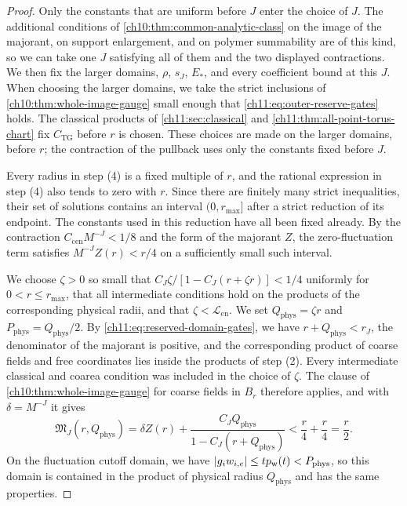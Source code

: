\begin{proof}
Only the constants that are uniform before $J$ enter the choice of $J$. The additional conditions of \cref{ch10:thm:common-analytic-class} on the image of the majorant, on support enlargement, and on polymer summability are of this kind, so we can take one $J$ satisfying all of them and the two displayed contractions. We then fix the larger domains, $\rho$, $s_J$, $E_*$, and every coefficient bound at this $J$. When choosing the larger domains, we take the strict inclusions of \cref{ch10:thm:whole-image-gauge} small enough that \eqref{ch11:eq:outer-reserve-gates} holds. The classical products of \cref{ch11:sec:classical} and \cref{ch11:thm:all-point-torus-chart} fix $C_{\mathrm{TG}}$ before $r$ is chosen. These choices are made on the larger domains, before $r$; the contraction of the pullback uses only the constants fixed before $J$.

Every radius in step (4) is a fixed multiple of $r$, and the rational expression in step (4) also tends to zero with $r$. Since there are finitely many strict inequalities, their set of solutions contains an interval $(0,r_{\max}]$ after a strict reduction of its endpoint. The constants used in this reduction have all been fixed already. By the contraction $C_{\mathrm{cen}}M^{-J}<1/8$ and the form of the majorant $Z$, the zero-fluctuation term satisfies $M^{-J}Z(r)<r/4$ on a sufficiently small such interval.

We choose $\zeta>0$ so small that $C_J\zeta/[1-C_J(r+\zeta r)]<1/4$ uniformly for $0<r\le r_{\max}$, that all intermediate conditions hold on the products of the corresponding physical radii, and that $\zeta<\mathscr L_{\mathrm{en}}$. We set $Q_{\mathrm{phys}}=\zeta r$ and $P_{\mathrm{phys}}=Q_{\mathrm{phys}}/2$. By \eqref{ch11:eq:reserved-domain-gates}, we have $r+Q_{\mathrm{phys}}<r_J$, the denominator of the majorant is positive, and the corresponding product of coarse fields and free coordinates lies inside the products of step (2). Every intermediate classical and coarea condition was included in the choice of $\zeta$. The clause of \cref{ch10:thm:whole-image-gauge} for coarse fields in $B_r$ therefore applies, and with $\delta=M^{-J}$ it gives
\[
 \mathfrak M_J(r,Q_{\mathrm{phys}})=\delta Z(r)+\frac{C_JQ_{\mathrm{phys}}}{1-C_J(r+Q_{\mathrm{phys}})}<\frac r4+\frac r4=\frac r2.
\]
On the fluctuation cutoff domain, we have $\lvert g_iw_{i,e}\rvert\le tp_{\mathrm w}(t)<P_{\mathrm{phys}}$, so this domain is contained in the product of physical radius $Q_{\mathrm{phys}}$ and has the same properties.


\end{proof}
